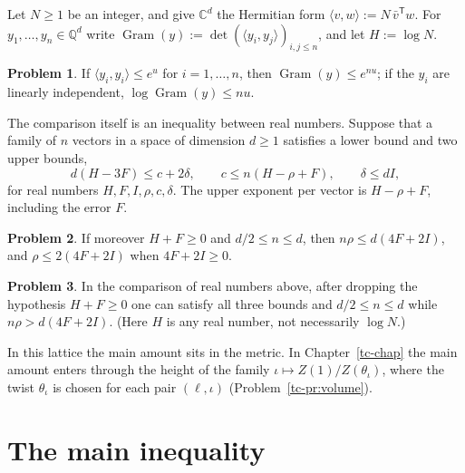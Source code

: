 \documentclass[reqno]{amsart}
\newcounter{chap}
\theoremstyle{definition}
\newtheorem{problem}{Problem}[section]
\theoremstyle{plain}
\newcommand{\Q}{{\mathbb{Q}}}
\newcommand{\C}{{\mathbb{C}}}
\newcommand{\Gram}{\operatorname{Gram}}
\begin{document}
Let \(N \ge 1\) be an integer, and give \(\C^d\) the Hermitian form \(\langle v, w \rangle := N\, \bar v^{\mathsf T} w\).  For \(y_1, \dots, y_n \in \Q^d\) write \(\Gram(y) := \det(\langle y_i, y_j \rangle)_{i,j \le n}\), and let \(H := \log N\).

\begin{problem}\label{pr:toy-hadamard}
If \(\langle y_i, y_i \rangle \le e^{u}\) for \(i = 1, \dots, n\), then \(\Gram(y) \le e^{nu}\); if the \(y_i\) are linearly independent, \(\log \Gram(y) \le nu\).
\end{problem}

The comparison itself is an inequality between real numbers.  Suppose that a family of \(n\) vectors in a space of dimension \(d \ge 1\) satisfies a lower bound and two upper bounds,
\[
  d(H - 3F) \le c + 2\delta , \qquad c \le n(H - \rho + F) , \qquad \delta \le dI ,
\]
for real numbers \(H, F, I, \rho, c, \delta\).  The upper exponent per vector is \(H - \rho + F\), including the error \(F\).

\begin{problem}\label{pr:toy-compare}
If moreover \(H + F \ge 0\) and \(d/2 \le n \le d\), then \(n\rho \le d(4F + 2I)\), and \(\rho \le 2(4F + 2I)\) when \(4F + 2I \ge 0\).
\end{problem}

\begin{problem}\label{pr:toy-sign}
In the comparison of real numbers above, after dropping the hypothesis \(H + F \ge 0\) one can satisfy all three bounds and \(d/2 \le n \le d\) while \(n\rho > d(4F + 2I)\).  (Here \(H\) is any real number, not necessarily \(\log N\).)
\end{problem}

In this lattice the main amount sits in the metric.  In Chapter~\ref{tc-chap} the main amount enters through the height of the family \(\iota \mapsto Z(1)/Z(\theta_\iota)\), where the twist \(\theta_\iota\) is chosen for each pair \((\ell, \iota)\) (Problem~\ref{tc-pr:volume}).

\section{The main inequality}\label{sec:main}
\end{document}
